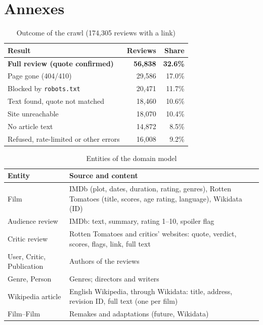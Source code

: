 \clearpage




\section{Annexes}
\suppressfloats[t]

\begin{table}
  \centering
  \caption{Outcome of the crawl (174,305 reviews with a link)}
  \label{tab:crawl}
  \small
  \begin{tabular}{lrr}
    \toprule
    Result & Reviews & Share \\
    \midrule
    \textbf{Full review (quote confirmed)} & \textbf{56,838} & \textbf{32.6\%} \\
    Page gone (404/410) & 29,586 & 17.0\% \\
    Blocked by \texttt{robots.txt} & 20,471 & 11.7\% \\
    Text found, quote not matched & 18,460 & 10.6\% \\
    Site unreachable & 18,070 & 10.4\% \\
    No article text & 14,872 & 8.5\% \\
    Refused, rate-limited or other errors & 16,008 & 9.2\% \\
    \bottomrule
  \end{tabular}
\end{table}

\begin{table}
  \centering
  \caption{Entities of the domain model}
  \label{tab:entities}
  \small
  \begin{tabularx}{\columnwidth}{lX}
    \toprule
    Entity & Source and content \\
    \midrule
    Film & IMDb (plot, dates, duration, rating, genres), Rotten Tomatoes (title, scores, age rating, language), Wikidata (ID) \\
    Audience review & IMDb: text, summary, rating 1--10, spoiler flag \\
    Critic review & Rotten Tomatoes and critics' websites: quote, verdict, scores, flags, link, full text \\
    User, Critic, Publication & Authors of the reviews \\
    Genre, Person & Genres; directors and writers \\
    Wikipedia article & English Wikipedia, through Wikidata: title, address, revision ID, full text (one per film) \\
    Film--Film & Remakes and adaptations (future, Wikidata) \\
    \bottomrule
  \end{tabularx}
\end{table}

